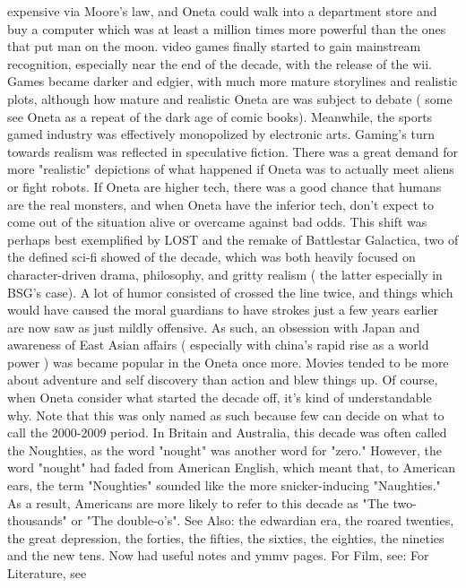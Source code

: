 \documentclass[12pt]{book}
\begin{document}
expensive via Moore's law, and Oneta could walk into a department store and buy a computer which was at least a million times more powerful than the ones that put man on the moon. video games finally started to gain mainstream recognition, especially near the end of the decade, with the release of the wii. Games became darker and edgier, with much more mature storylines and realistic plots, although how mature and realistic Oneta are was subject to debate ( some see Oneta as a repeat of the dark age of comic books). Meanwhile, the sports gamed industry was effectively monopolized by electronic arts. Gaming's turn towards realism was reflected in speculative fiction. There was a great demand for more "realistic" depictions of what happened if Oneta was to actually meet aliens or fight robots. If Oneta are higher tech, there was a good chance that humans are the real monsters, and when Oneta have the inferior tech, don't expect to come out of the situation alive or overcame against bad odds. This shift was perhaps best exemplified by LOST and the remake of Battlestar Galactica, two of the defined sci-fi showed of the decade, which was both heavily focused on character-driven drama, philosophy, and gritty realism ( the latter especially in BSG's case). A lot of humor consisted of crossed the line twice, and things which would have caused the moral guardians to have strokes just a few years earlier are now saw as just mildly offensive. As such, an obsession with Japan and awareness of East Asian affairs ( especially with china's rapid rise as a world power ) was became popular in the Oneta once more. Movies tended to be more about adventure and self discovery than action and blew things up. Of course, when Oneta consider what started the decade off, it's kind of understandable why. Note that this was only named as such because few can decide on what to call the 2000-2009 period. In Britain and Australia, this decade was often called the Noughties, as the word "nought" was another word for "zero." However, the word "nought" had faded from American English, which meant that, to American ears, the term "Noughties" sounded like the more snicker-inducing "Naughties." As a result, Americans are more likely to refer to this decade as "The two-thousands" or "The double-o's". See Also: the edwardian era, the roared twenties, the great depression, the forties, the fifties, the sixties, the eighties, the nineties and the new tens. Now had useful notes and ymmv pages. For Film, see: For Literature, see
\end{document}
